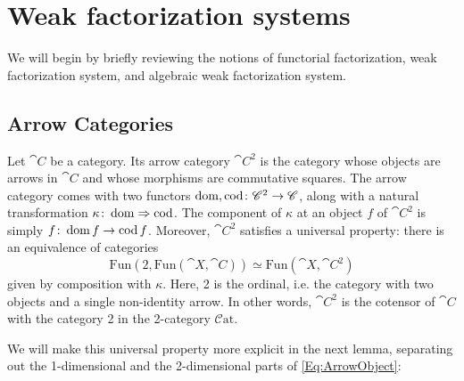 
\chapter{Weak factorization systems}

We will begin by briefly reviewing the notions of functorial factorization, weak factorization system, and algebraic weak factorization system. 

\section{Arrow Categories}

Let $\cat{C}$ be a category. Its arrow category $\cat{C}^2$ is the category whose objects are arrows in $\cat{C}$ and whose morphisms are commutative squares. The arrow category comes with two functors $\operatorname{dom},\operatorname{cod}\colon \mathscr{C}^2\to\mathscr{C}$, along with a natural transformation $\kappa\colon\operatorname{dom}\Rightarrow\operatorname{cod}$. The component of $\kappa$ at an object $f$ of $\cat{C}^2$ is simply $f\colon\operatorname{dom} f\to\operatorname{cod} f$. Moreover, $\cat{C}^2$ satisfies a universal property: there is an equivalence of categories
\begin{equation}\label{Eq:ArrowObject}
	\mathrm{Fun}(2,\mathrm{Fun}(\cat{X},\cat{C}))\simeq\mathrm{Fun}(\cat{X},\cat{C}^2)
\end{equation}
given by composition with $\kappa$. Here, 2 is the ordinal, i.e. the category with two objects and a single non-identity arrow. In other words, $\cat{C}^2$ is the cotensor of $\cat{C}$ with the category 2 in the 2-category $\mathcal{C}\mathrm{at}$.

We will make this universal property more explicit in the next lemma, separating out the 1-dimensional and the 2-dimensional parts of \eqref{Eq:ArrowObject}:

